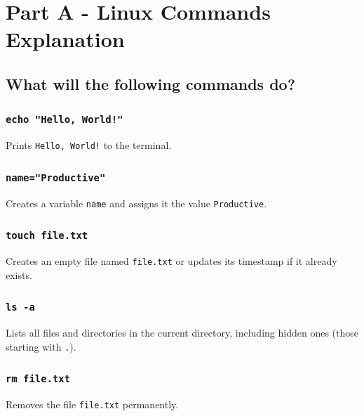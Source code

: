 \section{Part A - Linux Commands
Explanation}\label{part-a---linux-commands-explanation}

\subsection{What will the following commands
do?}\label{what-will-the-following-commands-do}

\subsubsection{\texorpdfstring{\texttt{echo\ "Hello,\ World!"}}{echo "Hello, World!"}}\label{echo-hello-world}

Prints \texttt{Hello,\ World!} to the terminal.

\subsubsection{\texorpdfstring{\texttt{name="Productive"}}{name="Productive"}}\label{nameproductive}

Creates a variable \texttt{name} and assigns it the value
\texttt{Productive}.

\subsubsection{\texorpdfstring{\texttt{touch\ file.txt}}{touch file.txt}}\label{touch-file.txt}

Creates an empty file named \texttt{file.txt} or updates its timestamp
if it already exists.

\subsubsection{\texorpdfstring{\texttt{ls\ -a}}{ls -a}}\label{ls--a}

Lists all files and directories in the current directory, including
hidden ones (those starting with \texttt{.}).

\subsubsection{\texorpdfstring{\texttt{rm\ file.txt}}{rm file.txt}}\label{rm-file.txt}

Removes the file \texttt{file.txt} permanently.

